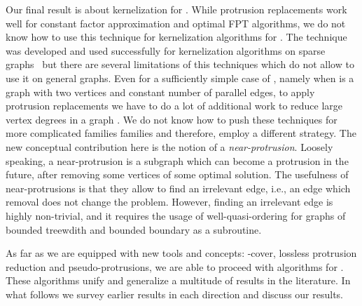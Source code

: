  
Our final result is about kernelization for \fd{}. 
While  protrusion replacements work well for constant factor approximation and optimal FPT algorithms, we do not know how to use this technique for kernelization algorithms for \fd. The technique was developed and used successfully  for kernelization algorithms 
  on  sparse graphs~\cite{BodlaenderFLPST09,FominLST10}
  but there are several limitations of this techniques which do not allow to use it on general graphs. Even for a sufficiently simple case of \fd, namely when  is a graph with two vertices and constant number of parallel edges, to apply protrusion replacements we have to do a lot of  additional work to reduce large vertex degrees in a graph  \cite{FominLMPS11}. We do not know how to push these techniques for more complicated families  families   and therefore, employ a different strategy. 
   The new conceptual contribution here is the notion of a \emph{near-protrusion}. Loosely speaking, a near-protrusion is a subgraph which can become a protrusion in the future, after removing some vertices of some optimal solution. The usefulness of   near-protrusions is that they allow to find an irrelevant edge, i.e.,  an edge  which removal does not change the problem. However, finding an irrelevant edge is highly non-trivial, and it requires the usage of well-quasi-ordering  for 
   graphs of bounded treewdith  and bounded boundary as a subroutine.   



As far as we are equipped with new tools and concepts:   -cover, lossless protrusion reduction and pseudo-protrusions, we are able to 
proceed with algorithms for  \fd{}. These algorithms  unify and generalize a multitude of results in the literature. In what follows we survey 
earlier results in each direction and discuss our results.





\vspace{-.3cm}
